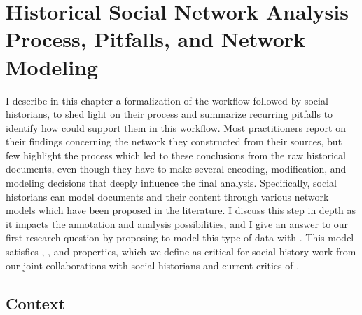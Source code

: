 \chapter{Historical Social Network Analysis Process, Pitfalls, and Network Modeling}\label{ch:hsna-process-and-network-modeling}
\minitoc

I describe in this chapter a formalization of the \hsna workflow followed by social historians, to shed light on their process and summarize recurring pitfalls to identify how \va could support them in this workflow.
Most \hsna practitioners report on their findings concerning the network they constructed from their sources, but few highlight the process which led to these conclusions from the raw historical documents, even though they have to make several encoding, modification, and modeling decisions that deeply influence the final analysis\cite{alkadi2022}.
Specifically, social historians can model documents and their content through various network models which have been proposed in the literature.
I discuss this step in depth as it impacts the annotation and analysis possibilities, and I give an answer to our first research question \qone by proposing to model this type of data with \modelplural.
This model satisfies \simplicity, \reality, and \traceability properties, which we define as critical for social history work from our joint collaborations with social historians and current critics of \hsna \cite{lemercier12FormalNetwork2015, lemercierBackSourcesPracticing2021, edelsteinHistoricalResearchDigital2017}.


\section{Context}

